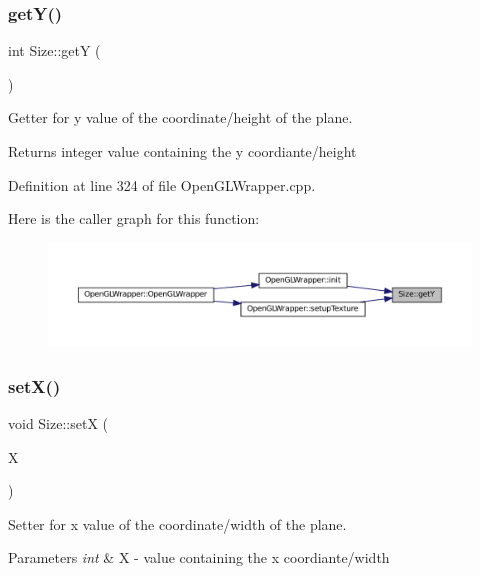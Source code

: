 \subsubsection{\texorpdfstring{getY()}{getY()}}
{\footnotesize\ttfamily int Size\+::getY (\begin{DoxyParamCaption}{ }\end{DoxyParamCaption})}



Getter for y value of the coordinate/height of the plane. 

\begin{DoxyReturn}{Returns}
integer value containing the y coordiante/height 
\end{DoxyReturn}


Definition at line 324 of file Open\+G\+L\+Wrapper.\+cpp.

Here is the caller graph for this function\+:\nopagebreak
\begin{figure}[H]
\begin{center}
\leavevmode
\includegraphics[width=350pt]{classSize_aea85ae41eda5b85e61b72b3f9b1b4799_icgraph}
\end{center}
\end{figure}
\mbox{\label{classSize_a555a455ea033f7ec3173c9bda30a896d}} 
\subsubsection{\texorpdfstring{setX()}{setX()}}
{\footnotesize\ttfamily void Size\+::setX (\begin{DoxyParamCaption}\item[{int}]{X }\end{DoxyParamCaption})}



Setter for x value of the coordinate/width of the plane. 


\begin{DoxyParams}{Parameters}
{\em int} & X -\/ value containing the x coordiante/width \\
\hline
\end{DoxyParams}


